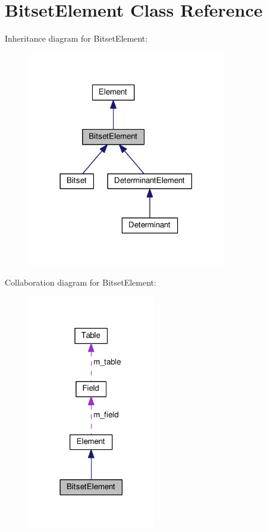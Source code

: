 \hypertarget{classBitsetElement}{}\section{Bitset\+Element Class Reference}
\label{classBitsetElement}


Inheritance diagram for Bitset\+Element\+:\nopagebreak
\begin{figure}[H]
\begin{center}
\leavevmode
\includegraphics[width=246pt]{classBitsetElement__inherit__graph}
\end{center}
\end{figure}


Collaboration diagram for Bitset\+Element\+:\nopagebreak
\begin{figure}[H]
\begin{center}
\leavevmode
\includegraphics[width=158pt]{classBitsetElement__coll__graph}
\end{center}
\end{figure}
